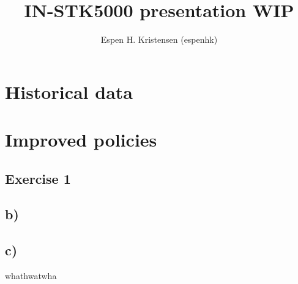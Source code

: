 \documentclass[a4paper]{article}
\begin{document}
\title{IN-STK5000 presentation WIP}
\author{Espen H. Kristensen (espenhk)}
\maketitle
{}

\listoftodos

\section{Historical data}

\section{Improved policies}
\subsection*{Exercise 1}
\subsection*{b)}
\subsection*{c)}

\clearpage
whathwatwha
\end{document}
